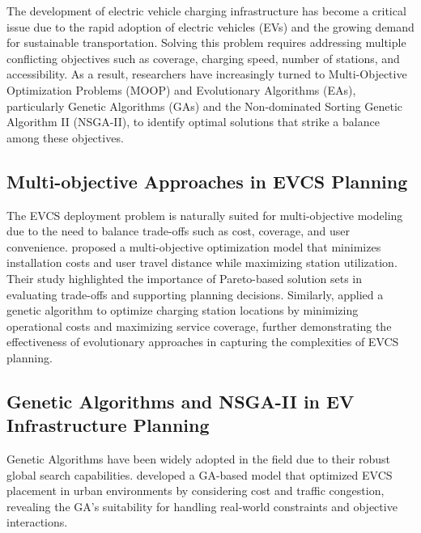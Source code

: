 
The development of electric vehicle charging infrastructure has become a critical issue due to the rapid adoption of electric vehicles (EVs) and the growing demand for sustainable transportation. Solving this problem requires addressing multiple conflicting objectives such as coverage, charging speed, number of stations, and accessibility. As a result, researchers have increasingly turned to Multi-Objective Optimization Problems (MOOP) and Evolutionary Algorithms (EAs), particularly Genetic Algorithms (GAs) and the Non-dominated Sorting Genetic Algorithm II (NSGA-II), to identify optimal solutions that strike a balance among these objectives.

\subsection{Multi-objective Approaches in EVCS Planning}

The EVCS deployment problem is naturally suited for multi-objective modeling due to the need to balance trade-offs such as cost, coverage, and user convenience.\cite{A multi-objective optimization model for electric vehicle charging station location planning} proposed a multi-objective optimization model that minimizes installation costs and user travel distance while maximizing station utilization. Their study highlighted the importance of Pareto-based solution sets in evaluating trade-offs and supporting planning decisions. Similarly,\cite{A genetic algorithm-based optimization for the location of electric vehicle charging stations} applied a genetic algorithm to optimize charging station locations by minimizing operational costs and maximizing service coverage, further demonstrating the effectiveness of evolutionary approaches in capturing the complexities of EVCS planning.

\subsection{Genetic Algorithms and NSGA-II in EV Infrastructure Planning}

Genetic Algorithms have been widely adopted in the field due to their robust global search capabilities. \citet{A genetic algorithm-based optimization for the location of electric vehicle charging stations} developed a GA-based model that optimized EVCS placement in urban environments by considering cost and traffic congestion, revealing the GA’s suitability for handling real-world constraints and objective interactions.

